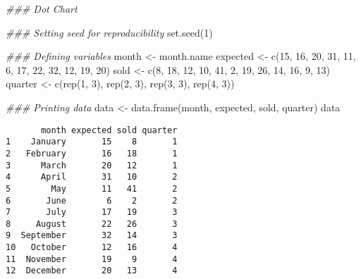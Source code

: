 \documentclass[
  letterpaper,
  DIV=11,
  numbers=noendperiod]{scrreprt}
\newenvironment{Shaded}{\begin{snugshade}}{\end{snugshade}}
\newcommand{\DecValTok}[1]{\textcolor[rgb]{0.68,0.00,0.00}{#1}}
\newcommand{\DocumentationTok}[1]{\textcolor[rgb]{0.37,0.37,0.37}{\textit{#1}}}
\newcommand{\FunctionTok}[1]{\textcolor[rgb]{0.28,0.35,0.67}{#1}}
\newcommand{\NormalTok}[1]{\textcolor[rgb]{0.00,0.23,0.31}{#1}}
\newcommand{\OtherTok}[1]{\textcolor[rgb]{0.00,0.23,0.31}{#1}}
\begin{document}
\begin{Shaded}
\begin{Highlighting}[]
\DocumentationTok{\#\#\# Dot Chart}

\DocumentationTok{\#\#\# Setting seed for reproducibility}
\FunctionTok{set.seed}\NormalTok{(}\DecValTok{1}\NormalTok{)}

\DocumentationTok{\#\#\# Defining variables}
\NormalTok{month }\OtherTok{\textless{}{-}}\NormalTok{ month.name}
\NormalTok{expected }\OtherTok{\textless{}{-}} \FunctionTok{c}\NormalTok{(}\DecValTok{15}\NormalTok{, }\DecValTok{16}\NormalTok{, }\DecValTok{20}\NormalTok{, }\DecValTok{31}\NormalTok{, }\DecValTok{11}\NormalTok{, }\DecValTok{6}\NormalTok{,}
              \DecValTok{17}\NormalTok{, }\DecValTok{22}\NormalTok{, }\DecValTok{32}\NormalTok{, }\DecValTok{12}\NormalTok{, }\DecValTok{19}\NormalTok{, }\DecValTok{20}\NormalTok{)}
\NormalTok{sold }\OtherTok{\textless{}{-}} \FunctionTok{c}\NormalTok{(}\DecValTok{8}\NormalTok{, }\DecValTok{18}\NormalTok{, }\DecValTok{12}\NormalTok{, }\DecValTok{10}\NormalTok{, }\DecValTok{41}\NormalTok{, }\DecValTok{2}\NormalTok{,}
          \DecValTok{19}\NormalTok{, }\DecValTok{26}\NormalTok{, }\DecValTok{14}\NormalTok{, }\DecValTok{16}\NormalTok{, }\DecValTok{9}\NormalTok{, }\DecValTok{13}\NormalTok{)}
\NormalTok{quarter }\OtherTok{\textless{}{-}} \FunctionTok{c}\NormalTok{(}\FunctionTok{rep}\NormalTok{(}\DecValTok{1}\NormalTok{, }\DecValTok{3}\NormalTok{), }\FunctionTok{rep}\NormalTok{(}\DecValTok{2}\NormalTok{, }\DecValTok{3}\NormalTok{), }\FunctionTok{rep}\NormalTok{(}\DecValTok{3}\NormalTok{, }\DecValTok{3}\NormalTok{), }\FunctionTok{rep}\NormalTok{(}\DecValTok{4}\NormalTok{, }\DecValTok{3}\NormalTok{))}

\DocumentationTok{\#\#\# Printing data}
\NormalTok{data }\OtherTok{\textless{}{-}} \FunctionTok{data.frame}\NormalTok{(month, expected, sold, quarter)}
\NormalTok{data}
\end{Highlighting}
\end{Shaded}

\begin{verbatim}
       month expected sold quarter
1    January       15    8       1
2   February       16   18       1
3      March       20   12       1
4      April       31   10       2
5        May       11   41       2
6       June        6    2       2
7       July       17   19       3
8     August       22   26       3
9  September       32   14       3
10   October       12   16       4
11  November       19    9       4
12  December       20   13       4
\end{verbatim}
\end{document}
